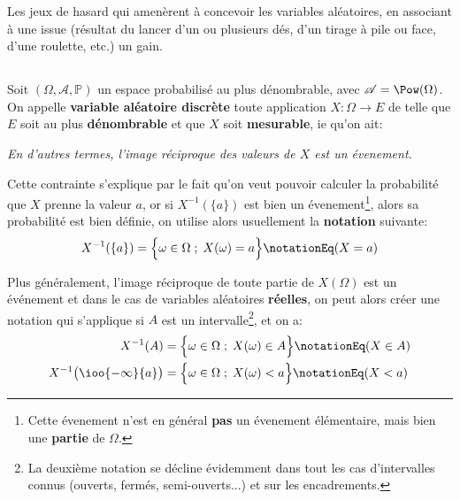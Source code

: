 Les jeux de hasard qui amenèrent à concevoir les variables aléatoires, en associant à une issue (résultat du lancer d'un ou plusieurs dés, d'un tirage à pile ou face, d'une roulette, etc.) un gain.

\subsection*{}
Soit \((\Omega, \mathscr{A}, \mathbb{P})\) un espace probabilisé au plus dénombrable, avec \(\mathscr{A} = \Pow(\Omega)\).\+
On appelle \textbf{variable aléatoire discrète} toute application \(X: \Omega \longrightarrow E\) de telle que \(E\) soit au plus \textbf{dénombrable} et que \(X\) soit \textbf{mesurable}, ie qu'on ait:

\begin{center}
   \textit{En d'autres termes, l'image réciproque des valeurs de \(X\) est un évenement.}
\end{center}
Cette contrainte s'explique par le fait qu'on veut pouvoir calculer la probabilité que \(X\) prenne la valeur \(a\), or si \(X^{-1}(\{a\})\) est bien un évenement\footnote[1]{Cette évenement n'est en général \textbf{pas} un évenement élémentaire, mais bien une \textbf{partie} de \(\Omega\).}, alors sa probabilité est bien définie, on utilise alors usuellement la \textbf{notation} suivante:
\[
   X^{-1}(\{a\}) = \Bigl\{ \omega \in \Omega \; ; \;  X(\omega) = a\Bigl\} \notationEq (X = a)  
\]

Plus généralement, l'image réciproque de toute partie de \(X(\Omega)\) est un événement et dans le cas de variables aléatoires \textbf{réelles}, on peut alors créer une notation qui s'applique si \(A\) est un intervalle\footnote[2]{La deuxième notation se décline évidemment dans tout les cas d'intervalles connus (ouverts, fermés, semi-ouverts...) et sur les encadrements.}, et on a:
\begin{align*}
   X^{-1}(A) &= \Bigl\{ \omega \in \Omega \; ; \;  X(\omega) \in A\Bigl\} \notationEq (X \in A) \\
   X^{-1}\bigl(\ioo{-\infty}{a}\bigl) &= \Bigl\{ \omega \in \Omega \; ; \;  X(\omega) < a\Bigl\} \notationEq (X < a)
\end{align*}

